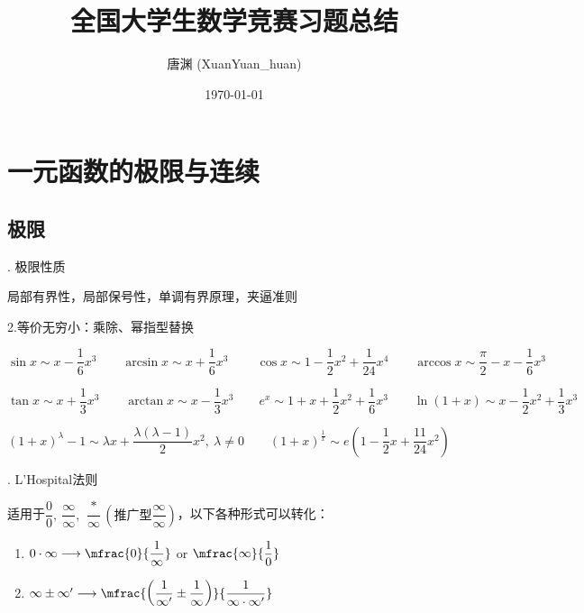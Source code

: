 \documentclass[UTF8]{ctexart}
\title{\heiti 全国大学生数学竞赛习题总结
\center{第三版}}
\author{\kaishu 唐渊 (XuanYuan\_huan)}
\date{\today}
\numberwithin{equation}{section}
\numberwithin{figure}{section}
\numberwithin{table}{section}
\newcommand\no{\noindent}
\begin{document}
    
\maketitle

\newpage

\tableofcontents

\newpage

\section{一元函数的极限与连续}

\subsection{极限}

\begin{spacing}{2}

\no 1. 极限性质

局部有界性，局部保号性，单调有界原理，夹逼准则

\no 2.等价无穷小：乘除、幂指型替换

$\sin x \sim x-\dfrac{1}{6}x^3 \qquad \arcsin x \sim x+\dfrac{1}{6}x^3\
\qquad \cos x \sim 1-\dfrac{1}{2}x^2+\dfrac{1}{24}x^4 \qquad 
\arccos x \sim \dfrac{\pi}{2}-x-\dfrac{1}{6}x^3  $

\vspace{0.3cm}

$ \tan x \sim x+\dfrac{1}{3}x^3\qquad \arctan x \sim x-\dfrac{1}{3}x^3 \qquad
e^x\sim 1+x+\dfrac{1}{2}x^2+\dfrac{1}{6}x^3\qquad \ln(1+x)\sim x-\dfrac{1}{2}x^2
+\dfrac{1}{3}x^3$

\vspace{0.3cm}

$(1+x)^\lambda-1\sim \lambda x+\dfrac{\lambda(\lambda-1)}{2}x^2,\ \lambda\neq0
\qquad (1+x)^{\tfrac{1}{x}}\sim e\left(1-\dfrac{1}{2}x+\dfrac{11}{24}x^2\right)$

\no 3. L'Hospital法则

适用于$\dfrac{0}{0},\ \dfrac{\infty}{\infty},\ \dfrac{*}{\infty}\left(\text{推广型}\dfrac{\infty}{\infty}\right)$，以下各种形式可以转化：

\begin{enumerate}[itemindent=1.4em, label=(\arabic*)]

\item $0\cdot\infty\longrightarrow\mfrac{0}{\dfrac{1}{\infty}}$ or $\mfrac{\infty}{\dfrac{1}{0}}$

\item $\infty\pm\infty'\longrightarrow\mfrac{\left(\dfrac{1}{\infty'}\pm\dfrac{1}{\infty}\right)}{\dfrac{1}{\infty\cdot\infty'}}$


\end{enumerate}
\end{spacing}
\end{document}
